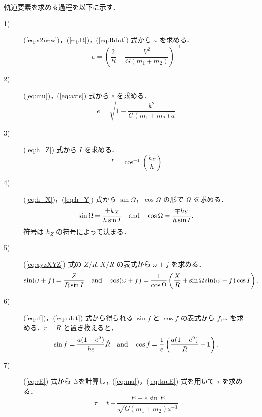\documentclass[11pt,a4paper,oneside,onecolumn]{jreport}
\begin{document}
軌道要素を求める過程を以下に示す．

\begin{description}
\item[1)] (\ref{eq:v2new})，(\ref{eq:R})，(\ref{eq:Rdot}) 式から $a$ を求める．
\begin{equation}
a = \left( \frac{2}{R} -\frac{V^2}{G (m_1 + m_2)} \right)^{-1} \label{eq:axis}
\end{equation}
\item[2)] (\ref{eq:mu})，(\ref{eq:axis}) 式から $e$ を求める．
\begin{equation}
e = \sqrt{1- \frac{h^2}{G (m_1 + m_2) a}} \label{eq:ecc}
\end{equation}
\item[3)] (\ref{eq:h_Z}) 式から $I$ を求める．
\begin{equation}
I = \cos^{-1} \left( \frac{h_Z}{h} \right) \label{eq:inc}
\end{equation}
\item[4)] (\ref{eq:h_X})，(\ref{eq:h_Y}) 式から $\sin \Omega，\cos \Omega$ の形で $\Omega$ を求める．
\begin{equation}
\sin \Omega = \frac{\pm h_X}{h \sin I} \quad {\rm and} \quad \cos \Omega = \frac{\mp h_Y}{h \sin I}. \label{eq:OMEGA}
\end{equation}
符号は $h_Z$ の符号によって決まる．
\item[5)] (\ref{eq:xyzXYZ}) 式の $Z/R, X/R$ の表式から $\omega + f$ を求める．
\begin{equation}
\sin (\omega + f) = \frac{Z}{R \sin I} \quad {\rm and} \quad \cos (\omega + f) = \frac{1}{\cos \Omega} \left( \frac{X}{R} + \sin \Omega \sin (\omega + f) \cos I \right). \label{eq:omega+f}
\end{equation}
\item[6)] (\ref{eq:rf})，(\ref{eq:rdot}) 式から得られる $\sin f$ と $\cos f$ の表式から $f, \omega$ を求める．$\dot{r} = \dot{R}$ と置き換えると，
\begin{equation}
\sin f = \frac{a (1 - e^2)}{h e} \dot{R} \quad {\rm and} \quad \cos f = \frac{1}{e} \left( \frac{a (1 - e^2)}{R} - 1 \right). \label{eq:f}
\end{equation}
\item[7)] (\ref{eq:rE}) 式から $E$を計算し，(\ref{eq:mu})，(\ref{eq:tauE}) 式を用いて $\tau$ を求める．
\begin{equation}
\tau = t - \frac{E - e \sin E}{\sqrt{G (m_1 + m_2) a^{-3}}} \label{eq:tau}
\end{equation}
\end{description}
\end{document}
